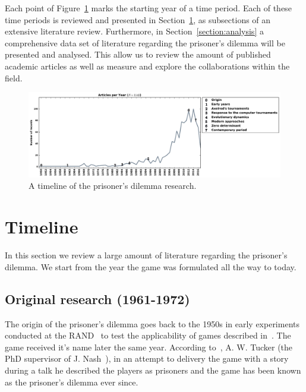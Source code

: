 \documentclass{article}
\theoremstyle{definition}
\begin{document}
Each point of Figure~\ref{fig:timeline} marks the starting year of a time period.
Each of these time periods is reviewed and presented in Section~\ref{section:timeline},
as subsections of an extensive literature review.
Furthermore, in Section~\ref{section:analysis} a comprehensive data set of literature
regarding the prisoner's dilemma will be presented and analysed. This allow us to
review the amount of published academic articles as well as measure and explore
the collaborations within the field.

\begin{figure}[!htbp]
    \centering
    \includegraphics[width=\textwidth]{assets/images/timeline.pdf}
    \caption{\label{fig:timeline} A timeline of the prisoner's dilemma research.}
\end{figure}

\section{Timeline}\label{section:timeline}

In this section we review a large amount of literature regarding the prisoner's
dilemma. We start from the year the game was formulated all the way to today.

\subsection{Original research (1961-1972)}\label{section:origin}

The origin of the prisoner's dilemma goes back to the 1950s in early experiments
conducted at the RAND~\cite{Flood1958} to test the applicability of games
described in~\cite{VonNeumann1944}. The game received it's name later the same year.
According to~\cite{Tucker1983}, A. W. Tucker (the PhD supervisor of J. Nash~\cite{Nash1951}),
in an attempt to delivery the game with a story during a talk he described the players
as prisoners and the game has been known as the prisoner's dilemma ever since.
\end{document}
